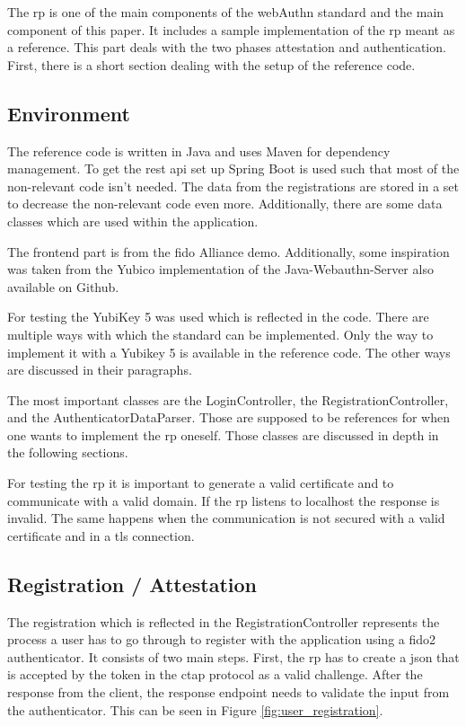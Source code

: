 \documentclass[a4paper, 11pt]{scrartcl}
\begin{document}
The \gls{rp} is one of the main components of the \gls{webAuthn} standard and the main component of this paper. It includes a sample implementation of the \gls{rp} meant as a reference. This part deals with the two phases attestation and authentication. First, there is a short section dealing with the setup of the reference code.

\subsection{Environment}

The reference code is written in Java and uses Maven for dependency management. To get the \gls{rest} \gls{api} set up Spring Boot is used such that most of the non-relevant code isn't needed. The data from the registrations are stored in a set to decrease the non-relevant code even more. Additionally, there are some data classes which are used within the application.

The frontend part is from the \gls{fido} Alliance demo\cite{fido:demo}. Additionally, some inspiration was taken from the Yubico implementation of the Java-Webauthn-Server also available on Github\cite{yubico:webauthn:server}. 

For testing the YubiKey 5 was used\cite{yubico:yubikey5} which is reflected in the code. There are multiple ways with which the standard can be implemented. Only the way to implement it with a Yubikey 5 is available in the reference code. The other ways are discussed in their paragraphs.

The most important classes are the LoginController, the RegistrationController, and the AuthenticatorDataParser. Those are supposed to be references for when one wants to implement the \gls{rp} oneself. Those classes are discussed in depth in the following sections.

For testing the \gls{rp} it is important to generate a valid certificate and to communicate with a valid domain. If the \gls{rp} listens to localhost the response is invalid. The same happens when the communication is not secured with a valid certificate and in a \gls{tls} connection.

\clearpage

\subsection{Registration / Attestation}

The registration which is reflected in the RegistrationController represents the process a user has to go through to register with the application using a \gls{fido2} authenticator. It consists of two main steps. First, the \gls{rp} has to create a \gls{json} that is accepted by the token in the \gls{ctap} protocol as a valid challenge. After the response from the client, the response endpoint needs to validate the input from the authenticator. This can be seen in Figure \ref{fig:user_registration}.
\end{document}
